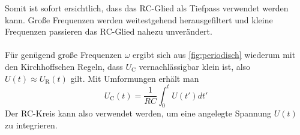 Somit ist sofort ersichtlich, dass das RC-Glied als Tiefpass verwendet werden kann. Große Frequenzen werden weitestgehend herausgefiltert und kleine Frequenzen passieren das RC-Glied nahezu unverändert. \\
\\Für genügend große Frequenzen  $\omega$ ergibt sich aus \ref{fig:periodisch} wiederum mit den Kirchhoffschen Regeln, dass $U_\text{C}$ vernachlässigbar klein ist, also $U(t) \approx U_\text{R}(t)$ gilt.
Mit Umformungen erhält man
\begin{equation}
  U_\text{C}(t)=\frac{1}{RC} \int_{0}^{t} U(t') dt'
\end{equation}
Der RC-Kreis kann also verwendet werden,  um eine angelegte Spannung $U(t)$ zu integrieren.
